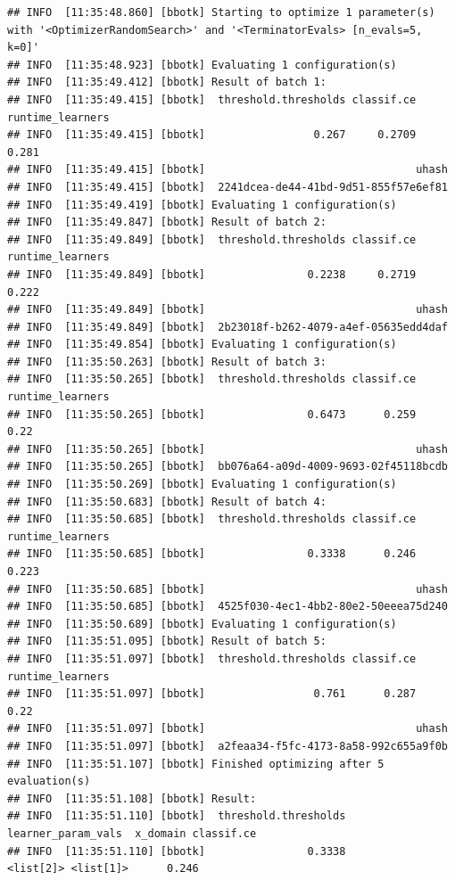 \documentclass[
]{scrbook}
\begin{document}
\begin{verbatim}
## INFO  [11:35:48.860] [bbotk] Starting to optimize 1 parameter(s) with '<OptimizerRandomSearch>' and '<TerminatorEvals> [n_evals=5, k=0]' 
## INFO  [11:35:48.923] [bbotk] Evaluating 1 configuration(s) 
## INFO  [11:35:49.412] [bbotk] Result of batch 1: 
## INFO  [11:35:49.415] [bbotk]  threshold.thresholds classif.ce runtime_learners 
## INFO  [11:35:49.415] [bbotk]                 0.267     0.2709            0.281 
## INFO  [11:35:49.415] [bbotk]                                 uhash 
## INFO  [11:35:49.415] [bbotk]  2241dcea-de44-41bd-9d51-855f57e6ef81 
## INFO  [11:35:49.419] [bbotk] Evaluating 1 configuration(s) 
## INFO  [11:35:49.847] [bbotk] Result of batch 2: 
## INFO  [11:35:49.849] [bbotk]  threshold.thresholds classif.ce runtime_learners 
## INFO  [11:35:49.849] [bbotk]                0.2238     0.2719            0.222 
## INFO  [11:35:49.849] [bbotk]                                 uhash 
## INFO  [11:35:49.849] [bbotk]  2b23018f-b262-4079-a4ef-05635edd4daf 
## INFO  [11:35:49.854] [bbotk] Evaluating 1 configuration(s) 
## INFO  [11:35:50.263] [bbotk] Result of batch 3: 
## INFO  [11:35:50.265] [bbotk]  threshold.thresholds classif.ce runtime_learners 
## INFO  [11:35:50.265] [bbotk]                0.6473      0.259             0.22 
## INFO  [11:35:50.265] [bbotk]                                 uhash 
## INFO  [11:35:50.265] [bbotk]  bb076a64-a09d-4009-9693-02f45118bcdb 
## INFO  [11:35:50.269] [bbotk] Evaluating 1 configuration(s) 
## INFO  [11:35:50.683] [bbotk] Result of batch 4: 
## INFO  [11:35:50.685] [bbotk]  threshold.thresholds classif.ce runtime_learners 
## INFO  [11:35:50.685] [bbotk]                0.3338      0.246            0.223 
## INFO  [11:35:50.685] [bbotk]                                 uhash 
## INFO  [11:35:50.685] [bbotk]  4525f030-4ec1-4bb2-80e2-50eeea75d240 
## INFO  [11:35:50.689] [bbotk] Evaluating 1 configuration(s) 
## INFO  [11:35:51.095] [bbotk] Result of batch 5: 
## INFO  [11:35:51.097] [bbotk]  threshold.thresholds classif.ce runtime_learners 
## INFO  [11:35:51.097] [bbotk]                 0.761      0.287             0.22 
## INFO  [11:35:51.097] [bbotk]                                 uhash 
## INFO  [11:35:51.097] [bbotk]  a2feaa34-f5fc-4173-8a58-992c655a9f0b 
## INFO  [11:35:51.107] [bbotk] Finished optimizing after 5 evaluation(s) 
## INFO  [11:35:51.108] [bbotk] Result: 
## INFO  [11:35:51.110] [bbotk]  threshold.thresholds learner_param_vals  x_domain classif.ce 
## INFO  [11:35:51.110] [bbotk]                0.3338          <list[2]> <list[1]>      0.246
\end{verbatim}
\end{document}
